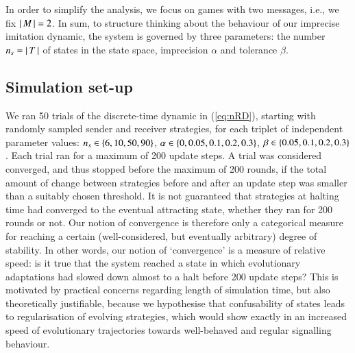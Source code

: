 \documentclass[11pt,english]{article}
\newcommand{\imprecision}{\ensuremath{\alpha}} %
\newcommand{\toler}{\ensuremath{\beta}} %
\newcommand{\ns}{\ensuremath{n_s}} %
\numberwithin{equation}{section}
\begin{document}
In order to simplify the analysis, we focus on games with two messages, i.e., we fix $\left \lvert \, M \, \right\rvert = 2$.
In sum, to structure thinking about the behaviour of our imprecise imitation dynamic, the system
is governed by three parameters: the number $\ns = \card{T}$ of states in the state space,
imprecision $\imprecision$ and tolerance $\toler$.


\subsection{Simulation set-up}
\label{sec:simulations}

We ran 50 trials of the discrete-time dynamic in (\ref{eq:nRD}), starting with randomly sampled
sender and receiver strategies, for each triplet of independent parameter values:
$\ns \in \set{6, 10, 50, 90}$, $\imprecision \in \set{0, 0.05, 0.1, 0.2, 0.3}$,
$\toler \in \set{0.05, 0.1, 0.2, 0.3}$. Each trial ran for a maximum of 200 update steps. A
trial was considered converged, and thus stopped before the maximum of 200 rounds, if the total
amount of change between strategies before and after an update step was smaller than a suitably
chosen threshold. It is not guaranteed that strategies at halting time had converged to the
eventual attracting state, whether they ran for 200 rounds or not. Our notion of convergence is
therefore only a categorical measure for reaching a certain (well-considered, but eventually
arbitrary) degree of stability. In other words, our notion of `convergence' is a measure of
relative speed: is it true that the system reached a state in which evolutionary adaptations
had slowed down almost to a halt before 200 update steps? This is motivated by practical
concerns regarding length of simulation time, but also theoretically justifiable, because we
hypothesise that confusability of states leads to regularisation of evolving strategies, which
would show exactly in an increased speed of evolutionary trajectories towards well-behaved and
regular signalling behaviour.
\end{document}
